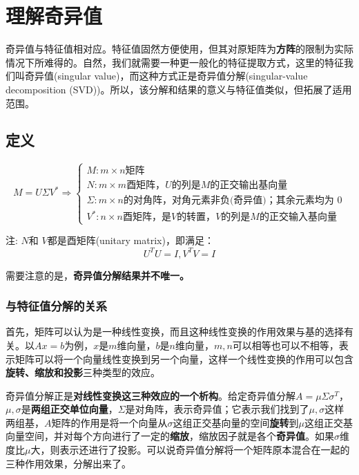\documentclass[12pt]{article}
\begin{document}
\section{理解奇异值\cite{How_To_Understand_Singular_Value}}
奇异值与特征值相对应。特征值固然方便使用，但其对原矩阵为\textbf{方阵}的限制为实际情况下所难得的。自然，我们就需要一种更一般化的特征提取方式，这里的特征我们叫奇异值(singular value)，而这种方式正是奇异值分解(singular-value decomposition (SVD))。所以，该分解和结果的意义与特征值类似，但拓展了适用范围\cite{Eigen_Value_And_Sigular_Value}。

\subsection{定义}
$$
M = U\Sigma V^* \Rightarrow 
\begin{cases}
M: m\times n\text{矩阵} \\
N: m\times m\text{酉矩阵，} U\text{的列是}M\text{的正交}\textbf{输出}\text{基向量}\\
\Sigma: m\times n\text{的对角阵，对角元素非负(奇异值)；其余元素均为 0} \\
V^*: n\times n\text{酉矩阵，是}V \text{的转置，}V\text{的列是}M\text{的正交}\textbf{输入}\text{基向量}
\end{cases}
$$

注: $N$和 $V$都是酉矩阵(unitary matrix)，即满足：
$$
U^TU = I, V^TV = I
$$

需要注意的是，\textbf{奇异值分解结果并不唯一。}

\subsubsection{与特征值分解的关系\cite{Eigen_Value_And_Sigular_Value_Relation}}
首先，矩阵可以认为是一种线性变换，而且这种线性变换的作用效果与基的选择有关。以$Ax = b$为例，$x$是$m$维向量，$b$是$n$维向量，$m,n$可以相等也可以不相等，表示矩阵可以将一个向量线性变换到另一个向量，这样一个线性变换的作用可以包含\textbf{旋转、缩放和投影}三种类型的效应。

奇异值分解正是\textbf{对线性变换这三种效应的一个析构}。给定奇异值分解$A = \mu\Sigma\sigma^T$，$\mu,\sigma$是\textbf{两组正交单位向量}，$\Sigma$是对角阵，表示奇异值；它表示我们找到了$\mu,\sigma$这样两组基，$A$矩阵的作用是将一个向量从$\sigma$这组正交基向量的空间\textbf{旋转}到$\mu$这组正交基向量空间，并对每个方向进行了一定的\textbf{缩放}，缩放因子就是各个\textbf{奇异值}。如果$\sigma$维度比$\mu$大，则表示还进行了投影。可以说奇异值分解将一个矩阵原本混合在一起的三种作用效果，分解出来了。
\end{document}
